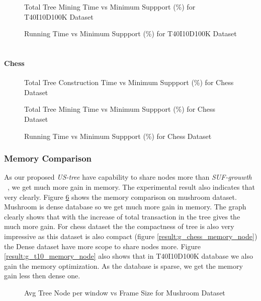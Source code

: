 			\begin{figure}
			\centering
				
			\caption{Total Tree Mining Time vs Minimum Suppport (\%) for T40I10D100K Dataset ~\cite{dataset}}
			\label{result:g_t10_mining_total}
			\end{figure}
			
			\begin{figure}
			\centering
				
			\caption{Running Time vs Minimum Suppport (\%) for T40I10D100K Dataset ~\cite{dataset}}
			\label{result:g_t10_total}
			\end{figure}
		
		\paragraph{Chess}
		
			\begin{figure}[h]
			\centering
				
			\caption{Total Tree Construction Time vs Minimum Suppport (\%) for Chess Dataset ~\cite{dataset}}
			\label{result:g_chess_tree_construction_total}
			\end{figure}
			
			\begin{figure}
			\centering
				
			\caption{Total Tree Mining Time vs Minimum Suppport (\%) for Chess Dataset ~\cite{dataset}}
			\label{result:g_chess_mining_total}
			\end{figure}
			
			\begin{figure}
			\centering
				
			\caption{Running Time vs Minimum Suppport (\%) for Chess Dataset ~\cite{dataset}}
			\label{result:g_chess_total}
			\end{figure}

\clearpage		
	\subsubsection{Memory Comparison}
		As our proposed \emph{US-tree} have capability to share nodes more than \emph{SUF-grouwth} ~\cite{dataset}, we get much more gain in memory. The experimental result also indicates that very clearly. Figure \ref{result:g_m_memory_node} shows the memory comparison on mushroom dataset. Mushroom is dense database so we get  much more gain in memory. The graph clearly shows that with the increase of total transaction in the tree gives the much more gain. For chess dataset the the compactness of tree is also very impressive as this dataset is also compact (figure \ref{result:g_chess_memory_node}) the Dense dataset have more scope to share nodes more. Figure \ref{result:g_t10_memory_node} also shows that in T40I10D100K database we also gain the memory optimization. As the database is sparse, we get the memory gain less then dense one.
			\begin{figure}[h]
			\centering
				
			\caption{Avg Tree Node per window vs Frame Size for Mushroom Dataset ~\cite{dataset}}
			\label{result:g_m_memory_node}
			\end{figure}
			
